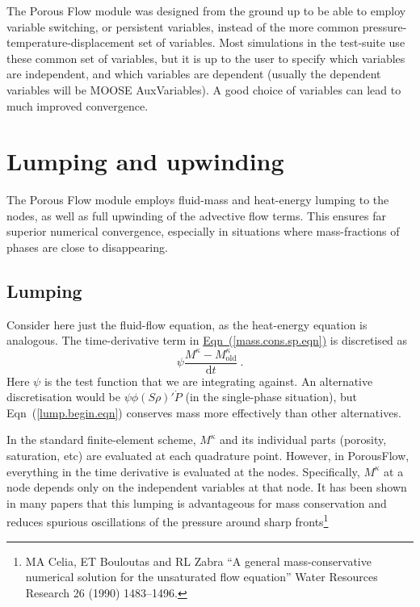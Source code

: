 \documentclass[12pt]{report}
\def\species{\kappa}
\def\d{\mathrm{d}}
\begin{document}
The Porous Flow module was designed from the ground up to be able to
employ variable switching, or persistent variables, instead of the
more common pressure-temperature-displacement set of variables.  Most
simulations in the test-suite use these common set of variables, but
it is up to the user to specify which variables are independent, and
which variables are dependent (usually the dependent variables will be
MOOSE AuxVariables).  A good choice of variables can lead to much
improved convergence.

\section{Lumping and upwinding}
\label{upwinding.and.lumping.sec}

The Porous Flow module employs fluid-mass and heat-energy lumping to
the nodes, as well as full upwinding of the advective flow terms.
This ensures far superior numerical convergence, especially in
situations where mass-fractions of phases are close to disappearing.

\subsection{Lumping}

Consider here just the fluid-flow equation, as the heat-energy
equation is analogous.  The time-derivative term in
\hyperref[mass.cons.sp.eqn]{Eqn~(\ref*{mass.cons.sp.eqn})} is discretised as
\begin{equation}
\psi \frac{M^{\species} - M^{\species}_{\mathrm{old}}}{\d t} \ .
\label{lump.begin.eqn}
\end{equation}
Here $\psi$ is the test function that we are integrating against.  An
alternative discretisation would be $\psi\phi(S\rho)'\dot{P}$ (in the
single-phase situation), but Eqn~(\ref{lump.begin.eqn}) conserves mass
more effectively than other alternatives.

In the standard finite-element scheme, $M^{\species}$ and its
individual parts (porosity, saturation, etc) are evaluated at each
quadrature point.  However, in PorousFlow, everything in the time
derivative is evaluated at the nodes.  Specifically, $M^{\species}$ at
a node depends only on the independent variables at that node.  It has
been shown in many papers that this lumping is advantageous for mass
conservation and reduces spurious oscillations of the pressure around
sharp fronts\footnote{MA Celia, ET Bouloutas and RL Zabra ``A general
  mass-conservative numerical solution for the unsaturated flow
  equation''  Water Resources Research 26 (1990) 1483--1496.}
\end{document}
